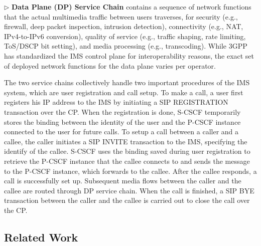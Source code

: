 $\triangleright$ \noindent\textbf{Data Plane (DP) Service Chain} contains a sequence of network functions that the actual multimedia traffic between users traverses, for security (e.g., firewall, deep packet inspection, intrusion detection), connectivity (e.g., NAT, IPv4-to-IPv6 conversion), quality of service (e.g., traffic shaping, rate limiting, ToS/DSCP bit setting), and media processing (e.g., transcoding). While 3GPP has standardized the IMS control plane for interoperability reasons, the exact set of deployed network functions for the data plane varies per operator.


The two service chains collectively handle two important procedures of the IMS system, which are user registration and call setup. %
To make a call, a user first registers his IP address to the IMS by initiating a SIP REGISTRATION transaction over the CP. When the registration is done, S-CSCF temporarily stores the binding between the identity of the user and the P-CSCF instance connected to the user for future calls. To setup a call between a caller and a callee, the caller initiates a SIP INVITE transaction to the IMS, specifying the identify of the callee. S-CSCF uses the binding saved during user registration to retrieve the P-CSCF instance that the callee connects to and sends the message to the P-CSCF instance, which forwards to the callee. After the callee responds, a call is successfully set up. Subsequent media flows between the caller and the callee are routed through DP service chain. When the call is finished, a SIP BYE transaction between the caller and the callee is carried out to close the call over the CP.


\vspace{-3mm}
\subsection{Related Work}


